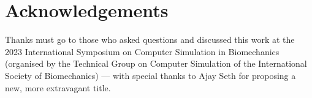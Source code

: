 \documentclass[]{elsarticle} %
\begin{document}
\hypertarget{acknowledgements}{%
\section{Acknowledgements}\label{acknowledgements}}

Thanks must go to those who asked questions and discussed this work at
the 2023 International Symposium on Computer Simulation in Biomechanics
(organised by the Technical Group on Computer Simulation of the
International Society of Biomechanics) --- with special thanks to Ajay
Seth for proposing a new, more extravagant title.

\newpage


\end{document}
